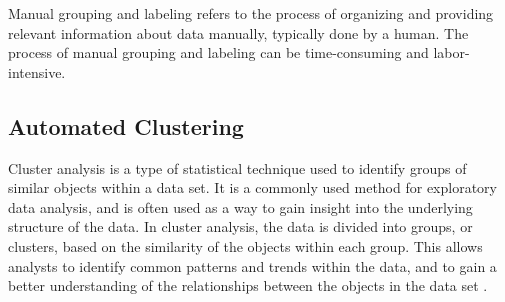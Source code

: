 Manual grouping and labeling refers to the process of organizing and
providing relevant information about data manually, typically done by a
human. The process of manual grouping and labeling can be time-consuming
and labor-intensive.




\subsection{Automated Clustering}

Cluster analysis is a type of statistical technique used to identify
groups of similar objects within a data set. It is a commonly used
method for exploratory data analysis, and is often used as a way to
gain insight into the underlying structure of the data. In cluster
analysis, the data is divided into groups, or clusters, based on the
similarity of the objects within each group. This allows analysts to
identify common patterns and trends within the data, and to gain a
better understanding of the relationships between the objects in the
data set \parencite{duran2013cluster}.



